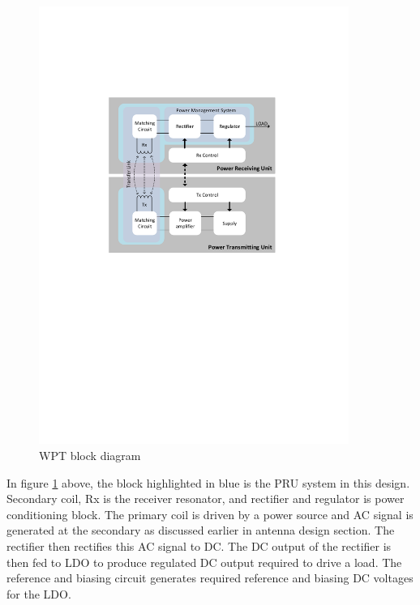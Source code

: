 \documentclass[12pt,a4paper,UKenglish]{article}
\begin{document}
\begin{figure} [H]
  \centering
  \includegraphics[width=0.9\textwidth]{img/wpt_ptu_pru.pdf} 
 \caption{WPT block diagram} 
\label{fig:wpt_ptu_pru} 
\end{figure}


In figure \ref{fig:wpt_ptu_pru} above, the block highlighted in blue is the PRU system in this design. Secondary coil, Rx is the receiver resonator, and  
rectifier and regulator is power conditioning block. The primary coil is driven by a power source and AC signal is generated at the secondary as discussed 
earlier in antenna design section. The rectifier then rectifies this AC signal to DC. The DC output of the rectifier is then fed to LDO 
to produce regulated DC output required to drive a load. The reference and biasing circuit generates required reference and biasing DC voltages for the LDO. \\
\end{document}

